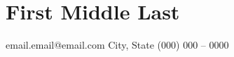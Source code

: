 \documentclass[11pt]{article}
\begin{document}

\newcommand{\shortitem}[3]{
  \def\temp{#3}\ifx\temp\empty
  \textbf{#1}
  \else
  \textbf{#1} -- #3
  \fi
  \hfill #2\\[2pt]}

\newcommand{\longitem}[3]{
  \textbf{#1} \hfill #2\\
  \begin{adjustwidth}{0.4cm}{2.2cm}
    #3
    \\[2pt]\end{adjustwidth}}
    
\newcommand{\mainSubitem}[3]{
  \def\temp{#3}\ifx\temp\empty
  \textbf{#1}
  \else
  \textbf{#1} #3
  \fi
  \hfill #2\\[2pt]}

\newcommand{\bulletSubitem}[1]{\hspace{0.125cm}\sbt #1\\[2pt]}
\newcommand{\indentSubitem}[1]{\hspace{0.3cm} #1\\[2pt]}

\newcommand{\sbt}[0]{\,\begin{picture}(-1,1)(-1,-3)\circle*{3}\end{picture} \ }



\newcommand{\myFullName}	{First Middle Last}
\newcommand{\myEmail}		{email.email@email.com}
\newcommand{\myCityState}	{City, State}
\newcommand{\myPhone}		{(000) 000 -- 0000}

\section*{\hfill\LARGE \myFullName \hfill}
\myEmail \hspace*{4cm} \myCityState \hspace*{5cm} \myPhone
\end{document}
